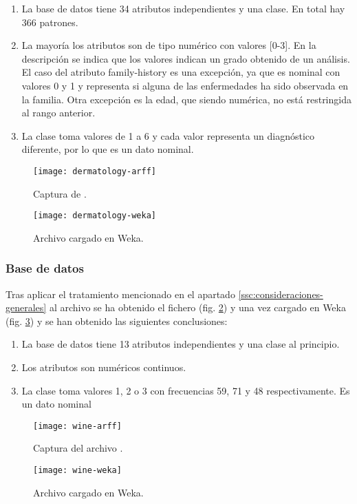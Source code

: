 \begin{enumerate}
    \item La base de datos tiene 34 atributos independientes y una clase. En total hay 366 patrones.
    \item La mayoría los atributos son de tipo numérico con valores [0-3]. En la descripción se indica que los valores indican un grado obtenido de un análisis. El caso del atributo family-history es una excepción, ya que es nominal con valores 0 y 1 y representa si alguna de las enfermedades ha sido observada en la familia. Otra excepción es la edad, que siendo numérica, no está restringida al rango anterior.
    \item La clase toma valores de 1 a 6 y cada valor representa un diagnóstico diferente, por lo que es un dato nominal.
\end{enumerate}
\begin{figure}[ht]
    \centering
    \begin{minipage}{0.45\textwidth}
        \centering
        \texttt{[image: dermatology-arff]}
        \caption{Captura de .}
        \label{fig:dermatology-arff}
    \end{minipage}\hfill
    \begin{minipage}{0.55\textwidth}
        \centering
        \texttt{[image: dermatology-weka]}
        \caption{Archivo  cargado en Weka.}
        \label{fig:dermatology-weka}
    \end{minipage}
\end{figure}


\subsubsection{Base de datos }
Tras aplicar el tratamiento mencionado en el apartado \ref{ssc:consideraciones-generales} al archivo  se ha obtenido el fichero  (fig. \ref{fig:wine-arff}) y una vez cargado en Weka (fig. \ref{fig:wine-weka}) y se han obtenido las siguientes conclusiones:

\begin{enumerate}
\item La base de datos tiene 13 atributos independientes y una clase al principio.
\item Los atributos son numéricos continuos.
\item La clase toma valores 1, 2 o 3 con frecuencias 59, 71 y 48 respectivamente. Es un dato nominal
\end{enumerate}
\begin{figure}[h]
    \centering
    \texttt{[image: wine-arff]}
    \caption{Captura del archivo .}
    \label{fig:wine-arff}
\end{figure}
\begin{figure}[h]
    \centering
    \texttt{[image: wine-weka]}
    \caption{Archivo  cargado en Weka.}
    \label{fig:wine-weka}
\end{figure}


